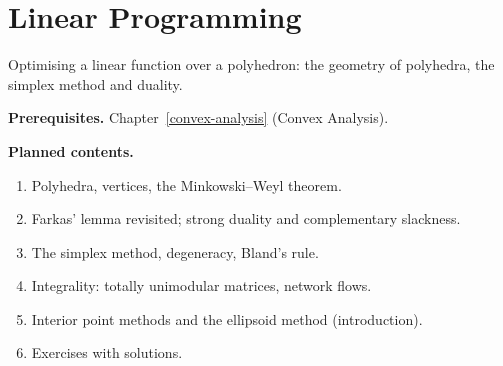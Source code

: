 \chapter{Linear Programming}\label{linear-programming}

Optimising a linear function over a polyhedron: the geometry of polyhedra, the simplex method and
duality.

\noindent\textbf{Prerequisites.} Chapter~\ref{convex-analysis} (Convex Analysis).

\noindent\textbf{Planned contents.}
\begin{enumerate}
\item Polyhedra, vertices, the Minkowski--Weyl theorem.
\item Farkas' lemma revisited; strong duality and complementary slackness.
\item The simplex method, degeneracy, Bland's rule.
\item Integrality: totally unimodular matrices, network flows.
\item Interior point methods and the ellipsoid method (introduction).
\item Exercises with solutions.
\end{enumerate}
